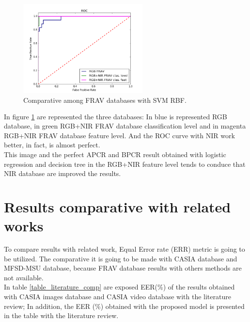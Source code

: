 \begin{figure}[htb]
\centering
\includegraphics[width=0.58\textwidth]{images/comparative/FRAVs_SVM_RBF_ROC.png}
\caption{Comparative among FRAV databases with SVM RBF.} \label{fig:FRAVS_SVM_comparative}
\end{figure}

In figure \ref{fig:FRAVS_SVM_comparative} are represented the three databases: In blue is represented RGB database, in green RGB+NIR FRAV database classification level and in magenta RGB+NIR FRAV database feature level. And the ROC curve with NIR work better, in fact, is almost perfect.\\

This image and the perfect APCR and BPCR result obtained with logistic regression and decision tree in the RGB+NIR feature level tends to conduce that NIR database are improved the results.\\

\section{Results comparative with related works}
To compare results with related work, Equal Error rate (ERR) metric is going to be utilized. The comparative it is going to be made with CASIA database and MFSD-MSU database, because FRAV database results with others methods are not available.\\

In table \ref{table_literature_comp} are exposed EER(\%) of the results obtained with CASIA images database and CASIA video database with the literature review; In addition, the EER (\%) obtained with the proposed model is presented in the table with the literature review.\\

